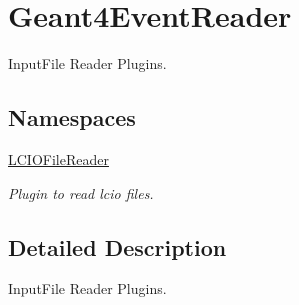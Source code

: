 \hypertarget{group___geant4_event_reader}{}\section{Geant4\+Event\+Reader}
\label{group___geant4_event_reader}


Input\+File Reader Plugins.  


\subsection*{Namespaces}
\begin{DoxyCompactItemize}
\item 
 \hyperlink{namespace_l_c_i_o_file_reader}{L\+C\+I\+O\+File\+Reader}
\begin{DoxyCompactList}\small\item\em Plugin to read lcio files. \end{DoxyCompactList}\end{DoxyCompactItemize}


\subsection{Detailed Description}
Input\+File Reader Plugins. 


